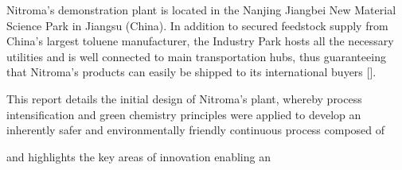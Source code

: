 Nitroma's demonstration plant is located in the Nanjing Jiangbei New Material Science Park in Jiangsu (China). In addition to secured feedstock supply from China’s largest toluene manufacturer, the Industry Park hosts all the necessary utilities and is well connected to main transportation hubs, thus guaranteeing that Nitroma's products can easily be shipped to its international buyers []. 


This report details the initial design of Nitroma's plant, whereby process intensification and green chemistry principles were applied to develop an inherently safer and environmentally friendly continuous process composed of 


and highlights the key areas of innovation enabling an 





